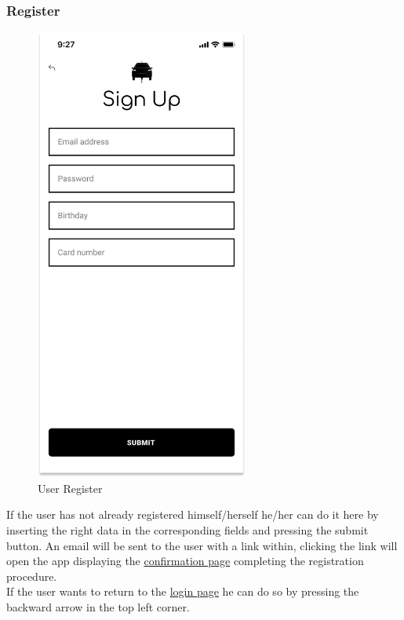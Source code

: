 \subsubsection{Register}
\begin{figure}[H]
    \centering
    \includegraphics[keepaspectratio, height=15cm]{Mockup/UserAppInterface/Register.png}
    \caption{User Register}
    \label{fig:Register}
\end{figure}
If the user has not already registered himself/herself he/her can do it here by inserting the right data in the corresponding fields and pressing the submit button.
An email will be sent to the user with a link within, clicking the link will open the app displaying the \hyperref[fig:ConfirmReg]{confirmation page} completing the registration procedure.\\
If the user wants to return to the \hyperref[fig:Login]{login page} he can do so by pressing the backward arrow in the top left corner.\\
